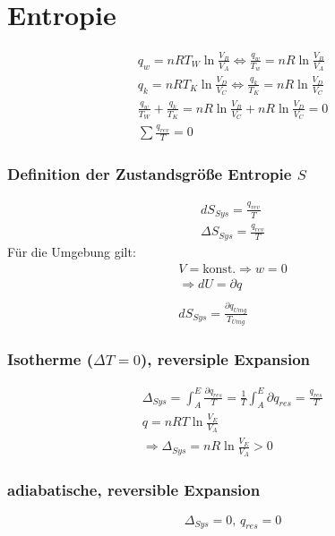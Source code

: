 \documentclass[a4paper, fleqn]{article}
\begin{document}
\section{Entropie}
\begin{eqnarray*}
    q_w=nRT_W\ln\frac{V_B}{V_A} \Leftrightarrow \frac{q_w}{T_w}=nR\ln\frac{V_B}{V_A}\\
    q_k = nRT_K\ln\frac{V_D}{V_C} \Leftrightarrow \frac{q_k}{T_K}=nR\ln\frac{V_D}{V_C}\\
    \frac{q_w}{T_W}+\frac{q_k}{T_K}=nR\ln\frac{V_B}{V_C}+nR\ln\frac{V_D}{V_C}=0\\
    \sum \frac{q_{rev}}{T}=0
\end{eqnarray*}

\subsubsection{Definition der Zustandsgröße Entropie $S$}
\begin{eqnarray*}
    dS_{Sys}=\frac{q_{rev}}{T}\\
    \Delta S_{Sys}=\frac{q_{rev}}{T}
\end{eqnarray*}
Für die Umgebung gilt:
\begin{eqnarray*}
    V = \text{konst.} \Rightarrow w = 0\\
    \Rightarrow dU = \partial q\\
    \\
    dS_{Sys} = \frac{\partial q_{Umg}}{T_{Umg}}
\end{eqnarray*}

\subsubsection{Isotherme ($\Delta T=0$), reversiple Expansion}
\begin{eqnarray*}
    \Delta_{Sys}=\int_{A}^{E}\frac{\partial q_{res}}{T} = \frac{1}{T} \int_{A}^{E} \partial q_{res} = \frac{q_{res}}{T}\\
    q = nRT\ln\frac{V_E}{V_A}\\
    \Rightarrow \Delta_{Sys} = nR\ln\frac{V_E}{V_A}>0
\end{eqnarray*}

\subsubsection{adiabatische, reversible Expansion}
\begin{equation*}
    \Delta_{Sys} = 0,\,q_{res}=0
\end{equation*}
\end{document}
